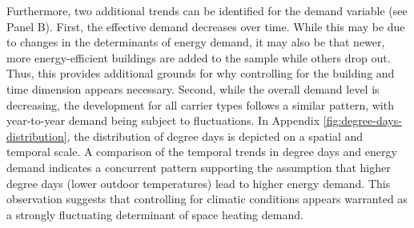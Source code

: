 \documentclass[12pt,twoside]{reedthesis}
\begin{document}
Furthermore, two additional trends can be identified for the demand variable (see Panel B). First, the effective demand decreases over time. While this may be due to changes in the determinants of energy demand, it may also be that newer, more energy-efficient buildings are added to the sample while others drop out. Thus, this provides additional grounds for why controlling for the building and time dimension appears necessary. Second, while the overall demand level is decreasing, the development for all carrier types follows a similar pattern, with year-to-year demand being subject to fluctuations. In Appendix \ref{fig:degree-days-distribution}, the distribution of degree days is depicted on a spatial and temporal scale. A comparison of the temporal trends in degree days and energy demand indicates a concurrent pattern supporting the assumption that higher degree days (lower outdoor temperatures) lead to higher energy demand. This observation suggests that controlling for climatic conditions appears warranted as a strongly fluctuating determinant of space heating demand.
\end{document}
